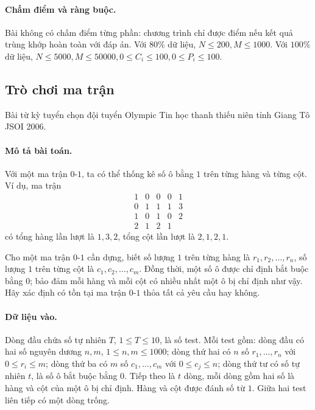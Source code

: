 \documentclass[11pt]{article}
\begin{document}
\paragraph{Chấm điểm và ràng buộc.}
Bài không có chấm điểm từng phần: chương trình chỉ được điểm nếu kết quả trùng
khớp hoàn toàn với đáp án. Với \(80\%\) dữ liệu,
\(N\le 200, M\le 1000\). Với \(100\%\) dữ liệu,
\(N\le 5000, M\le 50000, 0\le C_i\le 100, 0\le P_i\le 100\).

\subsection*{Trò chơi ma trận}

Bài từ kỳ tuyển chọn đội tuyển Olympic Tin học thanh thiếu niên tỉnh Giang Tô
JSOI 2006.

\paragraph{Mô tả bài toán.}
Với một ma trận \(0\)-\(1\), ta có thể thống kê số ô bằng \(1\) trên từng hàng
và từng cột. Ví dụ, ma trận
\[
\begin{array}{cccc|c}
1&0&0&0&1\\
0&1&1&1&3\\
1&0&1&0&2\\
\hline
2&1&2&1&
\end{array}
\]
có tổng hàng lần lượt là \(1,3,2\), tổng cột lần lượt là \(2,1,2,1\).

Cho một ma trận \(0\)-\(1\) cần dựng, biết số lượng \(1\) trên từng hàng là
\(r_1,r_2,\ldots,r_n\), số lượng \(1\) trên từng cột là
\(c_1,c_2,\ldots,c_m\). Đồng thời, một số ô được chỉ định bắt buộc bằng \(0\);
bảo đảm mỗi hàng và mỗi cột có nhiều nhất một ô bị chỉ định như vậy. Hãy xác
định có tồn tại ma trận \(0\)-\(1\) thỏa tất cả yêu cầu hay không.

\paragraph{Dữ liệu vào.}
Dòng đầu chứa số tự nhiên \(T\), \(1\le T\le 10\), là số test. Mỗi test gồm:
dòng đầu có hai số nguyên dương \(n,m\), \(1\le n,m\le 1000\); dòng thứ hai có
\(n\) số \(r_1,\ldots,r_n\) với \(0\le r_i\le m\); dòng thứ ba có \(m\) số
\(c_1,\ldots,c_m\) với \(0\le c_j\le n\); dòng thứ tư có số tự nhiên \(t\), là
số ô bắt buộc bằng \(0\). Tiếp theo là \(t\) dòng, mỗi dòng gồm hai số là hàng
và cột của một ô bị chỉ định. Hàng và cột được đánh số từ \(1\). Giữa hai test
liên tiếp có một dòng trống.
\end{document}
